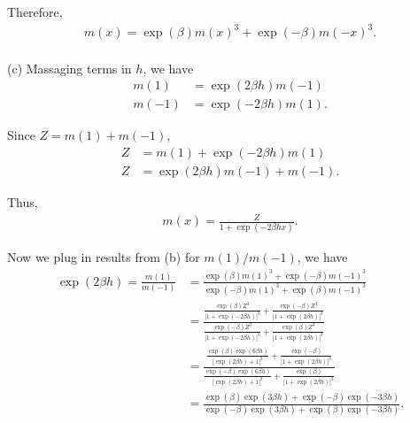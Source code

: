 \documentclass{article}
\begin{document}
Therefore, 
\begin{align}
	m(x) = \exp(\beta)m(x)^3 + \exp(-\beta)m(-x)^3. \label{eq:5b}
\end{align}
\\

\noindent
(c) Massaging terms in $h$, we have
\begin{align*}
	m(1) &= \exp(2\beta h)m(-1)\\
	m(-1) &= \exp(-2\beta h)m(1).
\end{align*}
%

Since $Z = m(1) + m(-1)$,
\begin{align*}
	Z &= m(1) + \exp(-2\beta h)m(1)\\
	Z &= \exp(2\beta h)m(-1) + m(-1).
\end{align*}
%

Thus,
\begin{align}
	m(x) = \frac{Z}{1 + \exp(-2\beta h x)}. \label{eq:5c}
\end{align}
%

Now we plug in results from (b) for $m(1) / m(-1)$, we have
\begin{align*}
	\exp(2\beta h) = \frac{m(1)}{m(-1)} &=
	\frac{\exp(\beta)m(1)^3 + \exp(-\beta)m(-1)^3}{\exp(-\beta)m(1)^3 + \exp(\beta)m(-1)^3} \\
	&=\frac{\frac{\exp(\beta)Z^3}{\big[1 + \exp(-2\beta h)\big]^3} +
	  \frac{\exp(-\beta)Z^3}{\big[1 + \exp(2\beta h)\big]^3}}
	  {\frac{\exp(-\beta)Z^3}{\big[1 + \exp(-2\beta h)\big]^3} + 
	  \frac{\exp(\beta)Z^3}{\big[1 + \exp(2\beta h)\big]^3}}\\
	&=\frac{\frac{\exp(\beta)\exp(6\beta h)}{\big[\exp(2\beta h) + 1\big]^3} +
	  \frac{\exp(-\beta)}{\big[1 + \exp(2\beta h)\big]^3}}
	  {\frac{\exp(-\beta)\exp(6\beta h)}{\big[\exp(2\beta h) + 1\big]^3} + 
	  \frac{\exp(\beta)}{\big[1 + \exp(2\beta h)\big]^3}}\\
	&=\frac{\exp(\beta)\exp(3\beta h) +
	        \exp(-\beta)\exp(-3\beta h)}
	       {\exp(-\beta)\exp(3\beta h) +
	        \exp(\beta)\exp(-3\beta h)}.
\end{align*}
%
\end{document}
